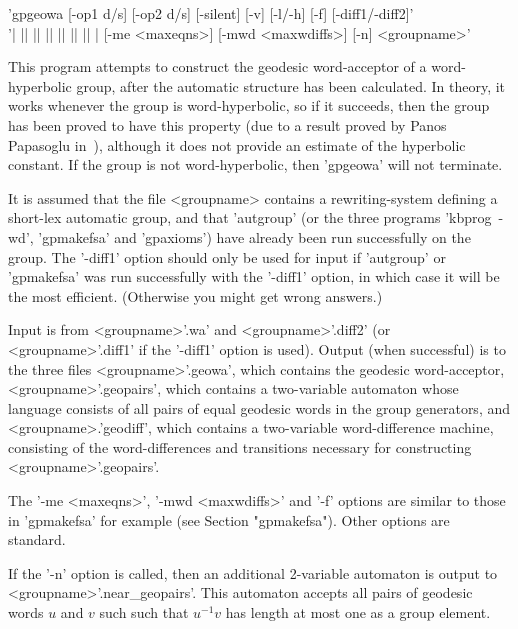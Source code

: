 
'gpgeowa [-op1 d/s] [-op2 d/s] [-silent] [-v] [-l/-h] [-f] [-diff1/-diff2]'\\
'| || || || || || || | [-me <maxeqns>] [-mwd <maxwdiffs>] [-n] <groupname>'

This program attempts to construct the geodesic word-acceptor of a
word-hyperbolic group, after the automatic structure has been calculated.
In theory, it works whenever the group is word-hyperbolic, so if it
succeeds, then the group has been proved to have this property (due
to a result proved by Panos Papasoglu in~\cite{PAP}),
although it does not provide an estimate of the hyperbolic constant.
If the group is not word-hyperbolic, then 'gpgeowa' will not terminate.

It is assumed that the file <groupname> contains a rewriting-system
defining a short-lex automatic group,
and that 'autgroup' (or the three programs 'kbprog\ -wd', 'gpmakefsa'
and 'gpaxioms') have already been run successfully on the group.
The '-diff1' option should only be used for input if  'autgroup' or
'gpmakefsa' was run successfully with the '-diff1' option, in which
case it will be the most efficient. (Otherwise you might get wrong answers.)

Input is from <groupname>'.wa' and  <groupname>'.diff2' (or <groupname>'.diff1'
if the '-diff1' option is used). Output (when successful) is to the three
files <groupname>'.geowa', which contains the geodesic word-acceptor,
<groupname>'.geopairs', which contains a two-variable automaton whose
language consists of all pairs of equal geodesic words in the group generators,
and <groupname>.'geodiff', which contains a two-variable word-difference
machine, consisting of the word-differences and transitions necessary for
constructing <groupname>'.geopairs'.

The '-me <maxeqns>', '-mwd <maxwdiffs>' and '-f' options are similar to those in
'gpmakefsa' for example (see Section "gpmakefsa"). Other options are standard.

If the '-n' option is called, then an additional 2-variable automaton
is output to <groupname>'.near\_geopairs'.
This automaton accepts all pairs of geodesic words $u$ and $v$ such
such that $u^{-1}v$ has length at most one as a group element.


